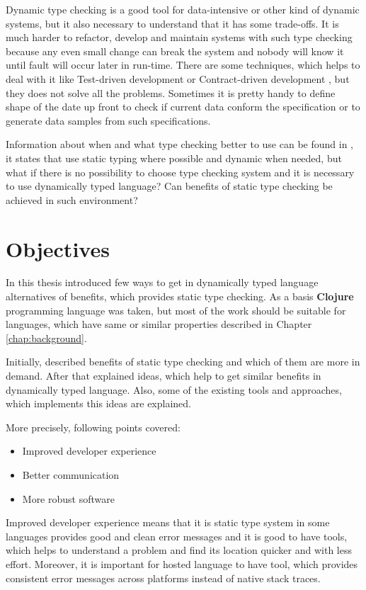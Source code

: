 Dynamic type checking is a good tool for data-intensive or other kind of dynamic
systems, but it also necessary to understand that it has some trade-offs. It is
much harder to refactor, develop and maintain systems with such type checking
because any even small change can break the system and nobody will know it until
fault will occur later in run-time. There are some techniques, which helps to
deal with it like Test-driven development \cite{beck2003test} or Contract-driven
development \cite{meyer2007contract}, but they does not solve all the problems.
Sometimes it is pretty handy to define shape of the date up front to check if
current data conform the specification or to generate data samples from such
specifications.

Information about when and what type checking better to use can be found in
\cite{meijer2004static}, it states that use static typing where possible and
dynamic when needed, but what if there is no possibility to choose type checking
system and it is necessary to use dynamically typed language? Can benefits of
static type checking be achieved in such environment?


\section{Objectives}
In this thesis introduced few ways to get in dynamically typed language
alternatives of benefits, which provides static type checking. As a basis
\textbf{Clojure} programming language was taken, but most of the work should be
suitable for languages, which have same or similar properties described in Chapter
\ref{chap:background}.

Initially, described benefits of static type checking and which of them are more
in demand. After that explained ideas, which help to get similar benefits in
dynamically typed language. Also, some of the existing tools and approaches,
which implements this ideas are explained.

More precisely, following points covered:
\begin{itemize}
\item Improved developer experience
\item Better communication
\item More robust software
\end{itemize}

Improved developer experience means that it is static type system in some
languages provides good and clean error messages and it is good to have tools,
which helps to understand a problem and find its location quicker and with less
effort. Moreover, it is important for hosted language to have tool, which
provides consistent error messages across platforms instead of native stack
traces.

